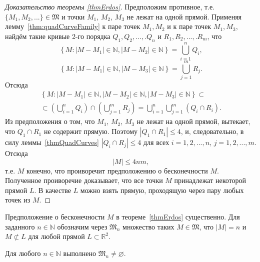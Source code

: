 \begin{proof}[Доказательство теоремы \ref{thmErdos}]
	Предположим противное,
	т.е. $\{M_1, M_2, ... \}\in\mathfrak{M}$
	и точки $M_1$, $M_2$, $M_3$ не лежат на одной прямой.
	Применяя лемму~\ref{thm:quadCurveFamily}
	к паре точек $M_1, M_2$ и к паре точек $M_1, M_3$,
	найдём такие кривые 2-го порядка
	$Q_1, Q_2,...,.Q_n$ и $R_1, R_2,...,.R_m$, что
	\begin{equation*}
		\left\{
			M: |M-M_1|\in\mathbb{N}, |M-M_2|\in\mathbb{N}
		\right\}
		=\bigcup_{i=1}^n Q_i
		,
	\end{equation*}
	\begin{equation*}
		\left\{
			M: |M-M_1|\in\mathbb{N}, |M-M_3|\in\mathbb{N}
		\right\}
		=\bigcup_{j=1}^m R_j
		.
	\end{equation*}
	Отсюда
	\begin{multline*}
		\left\{
			M:
			|M-M_1|\in\mathbb{N},
			|M-M_2|\in\mathbb{N},
			|M-M_3|\in\mathbb{N}
		\right\}
		\subset
		\\ \subset
		\left(\bigcup_{i=1}^n Q_i\right)
		\cap
		\left(\bigcup_{j=1}^m R_j\right)
		=
		\bigcup_{i=1}^n \bigcup_{j=1}^m \left( Q_i \cap R_i \right)
		.
	\end{multline*}
	Из предположения о том, что $M_1$, $M_2$, $M_3$
	не лежат на одной прямой, вытекает,
	что $Q_1\cap R_1$ не содержит прямую.
	Поэтому $|Q_1\cap R_1|\leqslant 4$,
	и, следовательно, в силу леммы~\ref{thmQuadCurves}
	$|Q_i\cap R_j|\leqslant 4$
	для всех $i=1,2,...,n$, $j=1,2,...,m$.
	Отсюда
	\begin{equation*}
		|M| \leqslant 4nm
		,
	\end{equation*}
	т.е. $M$ конечно,
	что проиворечит предположению о бесконечности $M$.
	Полученное проиворечие доказывает, что все точки $M$
	принадлежат некоторой прямой $L$.
	В качестве $L$ можно взять прямую,
	проходящую через пару любых точек из $M$.
\end{proof}

Предположение о бесконечности $M$ в теореме~\ref{thmErdos} существенно.
Для заданного $n\in\mathbb{N}$ обозначим через $\mathfrak{M}_n$
множество таких $M\in\mathfrak{M}$, что
$|M|=n$ и $M \not\subset L$ для любой прямой $L \subset\mathbb{R}^2$.

\begin{theorem}
	\label{thm:power_exist}
	Для любого $n\in\mathbb{N}$ выполнено $\mathfrak{M}_n\neq\varnothing$.
\end{theorem}

